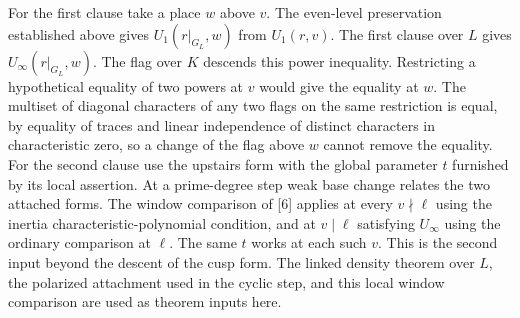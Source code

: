 For the first clause take a place $w$ above $v$. The even-level preservation established above gives $U_1(r|_{G_L},w)$ from $U_1(r,v)$. The first clause over $L$ gives $U_\infty(r|_{G_L},w)$. The flag over $K$ descends this power inequality. Restricting a hypothetical equality of two powers at $v$ would give the equality at $w$. The multiset of diagonal characters of any two flags on the same restriction is equal, by equality of traces and linear independence of distinct characters in characteristic zero, so a change of the flag above $w$ cannot remove the equality. For the second clause use the upstairs form with the global parameter $t$ furnished by its local assertion. At a prime-degree step weak base change relates the two attached forms. The window comparison of [6] applies at every $v\nmid\ell$ using the inertia characteristic-polynomial condition, and at $v\mid\ell$ satisfying $U_\infty$ using the ordinary comparison at $\ell$. The same $t$ works at each such $v$. This is the second input beyond the descent of the cusp form. The linked density theorem over $L$, the polarized attachment used in the cyclic step, and this local window comparison are used as theorem inputs here.

